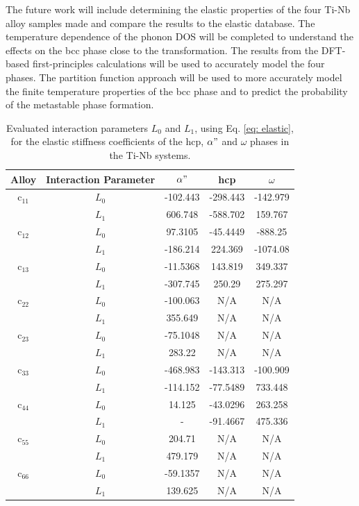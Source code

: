 The future work will include determining the elastic properties of the four Ti-Nb alloy samples made and compare the results to the elastic database. The temperature dependence of the phonon DOS will be completed to understand the effects on the bcc phase close to the transformation. The results from the DFT-based first-principles calculations will be used to accurately model the four phases. The partition function approach will be used to more accurately model the finite temperature properties of the bcc phase and to predict the probability of the metastable phase formation.

\newpage
\begin{table}[H]
	\caption{Evaluated interaction parameters $L_0$ and $L_1$, using Eq. \ref{eq: elastic}, for the elastic stiffness coefficients of the hcp, $\alpha"$ and $\omega$ phases in the Ti-Nb systems.}
	\centering
	\begin{tabular}{ c c c c c }
		\hline
		Alloy & Interaction Parameter & $\alpha"$ & hcp & $\omega$\\
		\hline
		c$_{11}$ & $L_{0}$ & -102.443 & -298.443 & -142.979 \\
		& $L_{1}$ & 606.748 & -588.702 & 159.767 \\
		c$_{12}$ & $L_{0}$ & 97.3105 & -45.4449 & -888.25 \\
		& $L_{1}$ & -186.214 & 224.369 & -1074.08 \\
		c$_{13}$ & $L_{0}$ & -11.5368 & 143.819 & 349.337 \\
		& $L_{1}$ & -307.745 & 250.29 & 275.297 \\
		c$_{22}$ & $L_{0}$ & -100.063 & N/A & N/A \\
		& $L_{1}$ & 355.649 & N/A & N/A \\
		c$_{23}$ & $L_{0}$ & -75.1048 & N/A & N/A \\
		& $L_{1}$ & 283.22 & N/A & N/A \\
		c$_{33}$ & $L_{0}$ & -468.983 & -143.313 & -100.909 \\
		& $L_{1}$ & -114.152 & -77.5489 & 733.448 \\
		c$_{44}$ & $L_{0}$ & 14.125 & -43.0296 & 263.258 \\
		& $L_{1}$ & - & -91.4667 & 475.336 \\
		c$_{55}$ & $L_{0}$ & 204.71 & N/A & N/A \\
		& $L_{1}$ & 479.179 & N/A & N/A \\
		c$_{66}$ & $L_{0}$ & -59.1357 & N/A & N/A \\
		& $L_{1}$ & 139.625 & N/A & N/A \\
		\hline
	\end{tabular}
	\label{Ch7-table:intpara}
\end{table}
\clearpage

